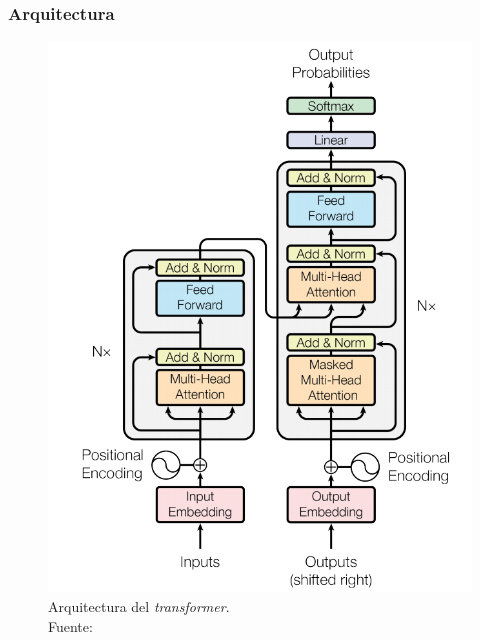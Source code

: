 \subsubsection{Arquitectura}

\vspace{2mm}

\begin{figure}
\includegraphics[width=0.95\linewidth]{imagenes/transformer-arquitectura.png} 
\caption{Arquitectura del \textit{transformer}.\\Fuente: \cite{NIPS2017_3f5ee243}}
\label{fig:arquitectura-transformer}
\end{figure}

